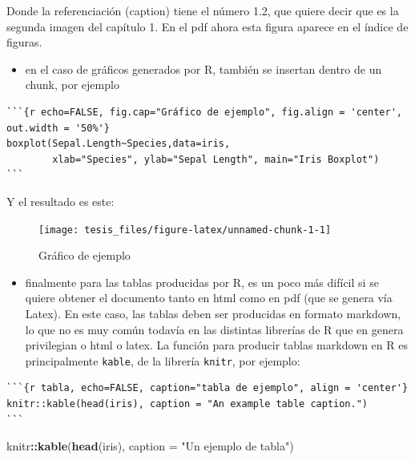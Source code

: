 \documentclass[12pt,twoside]{templates/facsothesis}
\newenvironment{Shaded}{\begin{snugshade}}{\end{snugshade}}
\newcommand{\DataTypeTok}[1]{\textcolor[rgb]{0.13,0.29,0.53}{#1}}
\newcommand{\KeywordTok}[1]{\textcolor[rgb]{0.13,0.29,0.53}{\textbf{#1}}}
\newcommand{\NormalTok}[1]{#1}
\newcommand{\OperatorTok}[1]{\textcolor[rgb]{0.81,0.36,0.00}{\textbf{#1}}}
\newcommand{\StringTok}[1]{\textcolor[rgb]{0.31,0.60,0.02}{#1}}
\providecommand{\tightlist}{%
  \setlength{\itemsep}{0pt}\setlength{\parskip}{0pt}}
\begin{document}
Donde la referenciación (caption) tiene el número 1.2, que quiere decir que es la segunda imagen del capítulo 1. En el pdf ahora esta figura aparece en el índice de figuras.

\begin{itemize}
\tightlist
\item
  en el caso de gráficos generados por R, también se insertan dentro de un chunk, por ejemplo
\end{itemize}

\begin{verbatim}
```{r echo=FALSE, fig.cap="Gráfico de ejemplo", fig.align = 'center', out.width = '50%'}
boxplot(Sepal.Length~Species,data=iris,
        xlab="Species", ylab="Sepal Length", main="Iris Boxplot")
```
\end{verbatim}

Y el resultado es este:

\begin{figure}

{\centering \texttt{[image: tesis\_files/figure-latex/unnamed-chunk-1-1]} 

}

\caption{Gráfico de ejemplo}\label{fig:unnamed-chunk-1}
\end{figure}

\begin{itemize}
\tightlist
\item
  finalmente para las tablas producidas por R, es un poco más difícil si se quiere obtener el documento tanto en html como en pdf (que se genera vía Latex). En este caso, las tablas deben ser producidas en formato markdown, lo que no es muy común todavía en las distintas librerías de R que en genera privilegian o html o latex. La función para producir tablas markdown en R es principalmente \texttt{kable}, de la librería \texttt{knitr}, por ejemplo:
\end{itemize}

\begin{verbatim}
```{r tabla, echo=FALSE, caption="tabla de ejemplo", align = 'center'}
knitr::kable(head(iris), caption = "An example table caption.")
```
\end{verbatim}

\begin{Shaded}
\begin{Highlighting}[]
\NormalTok{knitr}\OperatorTok{::}\KeywordTok{kable}\NormalTok{(}\KeywordTok{head}\NormalTok{(iris), }\DataTypeTok{caption =} \StringTok{"Un ejemplo de tabla"}\NormalTok{)}
\end{Highlighting}
\end{Shaded}
\end{document}
